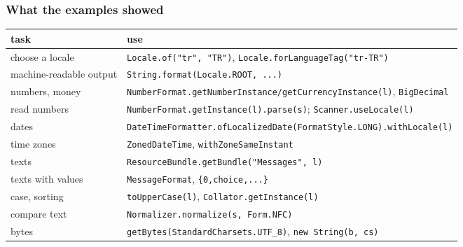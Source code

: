 \documentclass[aspectratio=169,10pt,compress]{beamer}
\begin{document}




\begin{frame}[t,fragile] \frametitle{What the examples showed}
  \begin{center}\scriptsize
  \begin{tabular}{L{0.3\textwidth}L{0.6\textwidth}}
    \toprule
    \textbf{task} & \textbf{use} \\
    \midrule
    choose a locale         & \texttt{Locale.of("tr", "TR")}, \texttt{Locale.forLanguageTag("tr-TR")} \\
    machine-readable output & \texttt{String.format(Locale.ROOT, ...)} \\
    numbers, money          & \texttt{NumberFormat.getNumberInstance/getCurrencyInstance(l)}, \texttt{BigDecimal} \\
    read numbers            & \texttt{NumberFormat.getInstance(l).parse(s)}; \texttt{Scanner.useLocale(l)} \\
    dates                   & \texttt{DateTimeFormatter.ofLocalizedDate(FormatStyle.LONG).withLocale(l)} \\
    time zones              & \texttt{ZonedDateTime}, \texttt{withZoneSameInstant} \\
    texts                   & \texttt{ResourceBundle.getBundle("Messages", l)} \\
    texts with values       & \texttt{MessageFormat}, \texttt{\{0,choice,...\}} \\
    case, sorting           & \texttt{toUpperCase(l)}, \texttt{Collator.getInstance(l)} \\
    compare text            & \texttt{Normalizer.normalize(s, Form.NFC)} \\
    bytes                   & \texttt{getBytes(StandardCharsets.UTF\_8)}, \texttt{new String(b, cs)} \\
    \bottomrule
  \end{tabular}
  \end{center}
\end{frame}
\end{document}
